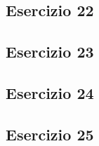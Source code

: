 \subsection{Esercizio 22}


\subsection{Esercizio 23}


\subsection{Esercizio 24}


\subsection{Esercizio 25}
